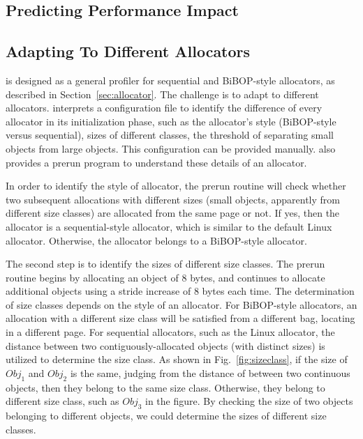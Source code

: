 \subsection{Predicting Performance Impact}
\label{sec:predict}

\subsection{Adapting To Different Allocators}
\label{sec:understandingallocators}

\MP{} is designed as a general profiler for sequential and BiBOP-style allocators, as described in Section~\ref{sec:allocator}. The challenge is to adapt  to different allocators. \MP{} interprets a configuration file to identify the difference of every allocator in its initialization phase, such as the allocator's style (BiBOP-style versus sequential), sizes of different classes, the threshold of separating small objects from large objects. This configuration can be provided manually. \MP{} also provides a prerun program to understand these details of an allocator. 

In order to identify the style of allocator, the prerun routine will check whether two subsequent allocations with different sizes (small objects, apparently from different size classes) are allocated from the same page or not. If yes, then the allocator is a sequential-style allocator, which is similar to the default Linux allocator. Otherwise, the allocator belongs to a BiBOP-style allocator. 

The second step is to identify the sizes of different size classes. The prerun routine begins by allocating an object of 8 bytes, and continues to allocate additional objects using a stride increase of 8 bytes each time. The determination of size classes depends on the style of an allocator. For BiBOP-style allocators, an allocation with a different size class will be satisfied from a different bag, locating in a different page. For sequential allocators, such as the Linux allocator, the distance between two contiguously-allocated objects (with distinct sizes) is utilized to determine the size class. As shown in Fig.~\ref{fig:sizeclass}, if the size of $Obj_1$ and $Obj_2$ is the same, judging from the distance of between two continuous objects, then they belong to the same size class. Otherwise, they belong to different size class, such as $Obj_3$ in the figure. By checking the size of two objects belonging to different objects, we could determine the sizes of different size classes.  

